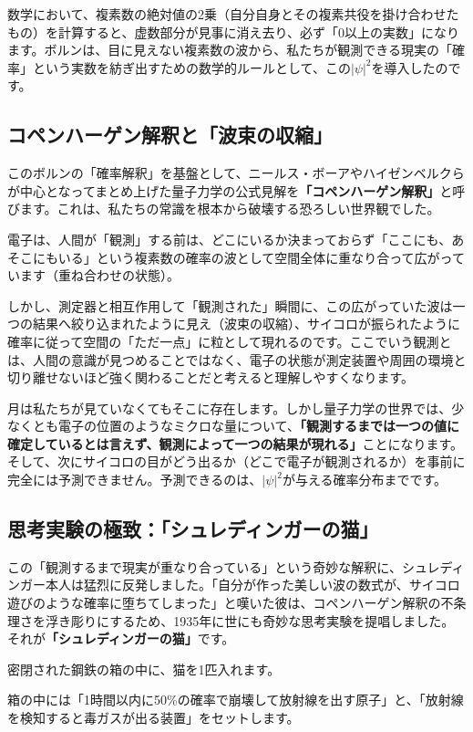 数学において、複素数の絶対値の2乗（自分自身とその複素共役を掛け合わせたもの）を計算すると、虚数部分が見事に消え去り、必ず「0以上の実数」になります。ボルンは、目に見えない複素数の波から、私たちが観測できる現実の「確率」という実数を紡ぎ出すための数学的ルールとして、この\(|\psi|^2\)を導入したのです。

\subsection{コペンハーゲン解釈と「波束の収縮」}

このボルンの「確率解釈」を基盤として、ニールス・ボーアやハイゼンベルクらが中心となってまとめ上げた量子力学の公式見解を\textbf{「コペンハーゲン解釈」}と呼びます。これは、私たちの常識を根本から破壊する恐ろしい世界観でした。

電子は、人間が「観測」する前は、どこにいるか決まっておらず「ここにも、あそこにもいる」という複素数の確率の波として空間全体に重なり合って広がっています（重ね合わせの状態）。

しかし、測定器と相互作用して「観測された」瞬間に、この広がっていた波は一つの結果へ絞り込まれたように見え（波束の収縮）、サイコロが振られたように確率に従って空間の「ただ一点」に粒として現れるのです。ここでいう観測とは、人間の意識が見つめることではなく、電子の状態が測定装置や周囲の環境と切り離せないほど強く関わることだと考えると理解しやすくなります。

月は私たちが見ていなくてもそこに存在します。しかし量子力学の世界では、少なくとも電子の位置のようなミクロな量について、\textbf{「観測するまでは一つの値に確定しているとは言えず、観測によって一つの結果が現れる」}ことになります。そして、次にサイコロの目がどう出るか（どこで電子が観測されるか）を事前に完全には予測できません。予測できるのは、\(|\psi|^2\)が与える確率分布までです。

\subsection{思考実験の極致：「シュレディンガーの猫」}

この「観測するまで現実が重なり合っている」という奇妙な解釈に、シュレディンガー本人は猛烈に反発しました。「自分が作った美しい波の数式が、サイコロ遊びのような確率に堕ちてしまった」と嘆いた彼は、コペンハーゲン解釈の不条理さを浮き彫りにするため、1935年に世にも奇妙な思考実験を提唱しました。それが\textbf{「シュレディンガーの猫」}です。

密閉された鋼鉄の箱の中に、猫を1匹入れます。

箱の中には「1時間以内に50\%の確率で崩壊して放射線を出す原子」と、「放射線を検知すると毒ガスが出る装置」をセットします。

